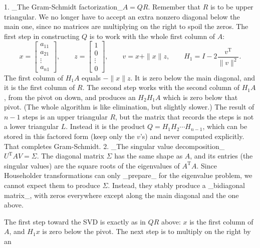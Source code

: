 1. _The Gram-Schmidt factorization_\(A=QR\). Remember that \(R\) is to be upper triangular. We no longer have to accept an extra nonzero diagonal below the main one, since no matrices are multiplying on the right to spoil the zeros. The first step in constructing \(Q\) is to work with the whole first column of \(A\): \[x=\begin{bmatrix}a_{11}\\ a_{21}\\ \vdots\\ a_{n1}\end{bmatrix},\qquad z=\begin{bmatrix}1\\ 0\\ \vdots\\ 0\end{bmatrix},\qquad v=x+\|x\|z,\qquad H_{1}=I-2\frac{v^{\mathrm{T}}}{\|v\| ^{2}}.\] The first column of \(H_{1}A\) equals \(-\|x\|z\). It is zero below the main diagonal, and it is the first column of \(R\). The second step works with the second column of \(H_{1}A\), from the pivot on down, and produces an \(H_{2}H_{1}A\) which is zero below that pivot. (The whole algorithm is like elimination, but slightly slower.) The result of \(n-1\) steps is an upper triangular \(R\), but the matrix that records the steps is not a lower triangular \(L\). Instead it is the product \(Q=H_{1}H_{2}\cdots H_{n-1}\), which can be stored in this factored form (keep only the \(v\)'s) and never computed explicitly. That completes Gram-Schmidt.
2. _The singular value decomposition_\(U^{\mathrm{T}}AV=\Sigma\). The diagonal matrix \(\Sigma\) has the same shape as \(A\), and its entries (the singular values) are the square roots of the eigenvalues of \(A^{\mathrm{T}}A\). Since Householder transformations can only _prepare_ for the eigenvalue problem, we cannot expect them to produce \(\Sigma\). Instead, they stably produce a _bidiagonal matrix_, with zeros everywhere except along the main diagonal and the one above.

The first step toward the SVD is exactly as in \(QR\) above: \(x\) is the first column of \(A\), and \(H_{1}x\) is zero below the pivot. The next step is to multiply on the right by an